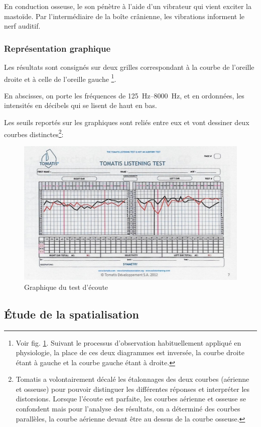 En conduction osseuse, le son pénètre à l'aide d'un
vibrateur qui vient exciter la mastoïde. Par l'intermédiaire de la
boîte crânienne, les vibrations informent le nerf auditif.

\subsubsection{Représentation graphique}

Les résultats sont consignés sur deux grilles correspondant à la courbe
de l'oreille droite et à celle de l'oreille gauche%
\footnote{Voir fig. \ref{fig:tomatislisteningtest}. Suivant le processus d'observation habituellement appliqué en physiologie,
la place de ces deux diagrammes est inversée, la courbe droite étant
à gauche et la courbe gauche étant à droite.}.

En abscisses, on porte les fréquences de \SIrange{125}{8000}{\Hz}, et en ordonnées,
les intensités en décibels qui se lisent de haut en bas. 

Les seuils reportés sur les graphiques sont reliés entre eux et vont
dessiner deux courbes distinctes\footnote{Tomatis a volontairement décalé les étalonnages des deux courbes (aérienne
	et osseuse) pour pouvoir distinguer les différentes réponses et interpréter
	les distorsions. Lorsque l'écoute est parfaite, les
	courbes aérienne et osseuse se confondent mais pour l'analyse des
	résultats, on a déterminé des courbes parallèles, la courbe aérienne
	devant être au dessus de la courbe osseuse.}: 


\begin{figure}
	\centering
	\includegraphics[width=0.7\linewidth]{images/tomatisListeningTest.jpg}
	\caption[Graphique du test d'écoute]{Graphique du test d'écoute}
	\label{fig:tomatislisteningtest}
\end{figure}


\subsection{\'Etude de la spatialisation}

